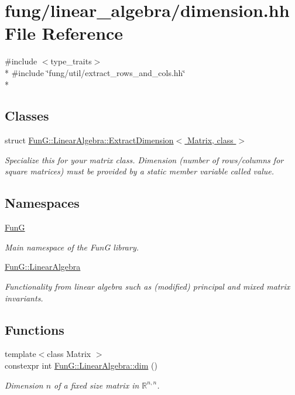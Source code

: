 \hypertarget{dimension_8hh}{}\section{fung/linear\+\_\+algebra/dimension.hh File Reference}
\label{dimension_8hh}
{\ttfamily \#include $<$type\+\_\+traits$>$}\\*
{\ttfamily \#include \char`\"{}fung/util/extract\+\_\+rows\+\_\+and\+\_\+cols.\+hh\char`\"{}}\\*
\subsection*{Classes}
\begin{DoxyCompactItemize}
\item 
struct \hyperlink{structFunG_1_1LinearAlgebra_1_1ExtractDimension}{Fun\+G\+::\+Linear\+Algebra\+::\+Extract\+Dimension$<$ Matrix, class $>$}
\begin{DoxyCompactList}\small\item\em Specialize this for your matrix class. Dimension (number of rows/columns for square matrices) must be provided by a static member variable called value. \end{DoxyCompactList}\end{DoxyCompactItemize}
\subsection*{Namespaces}
\begin{DoxyCompactItemize}
\item 
 \hyperlink{namespaceFunG}{FunG}
\begin{DoxyCompactList}\small\item\em Main namespace of the FunG library. \end{DoxyCompactList}\item 
 \hyperlink{namespaceFunG_1_1LinearAlgebra}{Fun\+G\+::\+Linear\+Algebra}
\begin{DoxyCompactList}\small\item\em Functionality from linear algebra such as (modified) principal and mixed matrix invariants. \end{DoxyCompactList}\end{DoxyCompactItemize}
\subsection*{Functions}
\begin{DoxyCompactItemize}
\item 
{\footnotesize template$<$class Matrix $>$ }\\constexpr int \hyperlink{namespaceFunG_1_1LinearAlgebra_a13a029820c29d530274ae94968d642d4}{Fun\+G\+::\+Linear\+Algebra\+::dim} ()
\begin{DoxyCompactList}\small\item\em Dimension $n$ of a fixed size matrix in $\mathbb{R}^{n,n}$. \end{DoxyCompactList}\end{DoxyCompactItemize}
